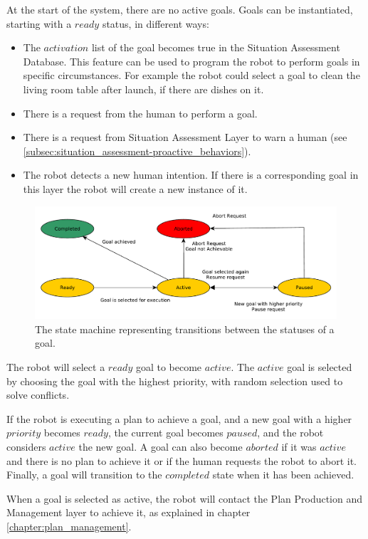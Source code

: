 At the start of the system, there are no active goals. Goals can be instantiated, starting with a $ready$ status, in different ways:
\begin{itemize}
\item The $activation$ list of the goal becomes true in the Situation Assessment Database. This feature can be used to program the robot to perform goals in specific circumstances. For example the robot could select a goal to clean the living room table after launch, if there are dishes on it.
\item There is a request from the human to perform a goal. 
\item There is a request from Situation Assessment Layer to warn a human (see \ref{subsec:situation_assessment-proactive_behaviors}).
\item The robot detects a new human intention. If there is a corresponding goal in this layer the robot will create a new instance of it. 
\end{itemize}


\begin{figure}[h!]
	\centering
	\includegraphics[clip,scale=0.6]{img/goal_management/goal_cycle.pdf}
	\caption{The state machine representing transitions between the statuses of a goal.}
	\label{fig:goal_management-goal_cycle}
\end{figure}



The robot will select a $ready$ goal to become $active$. The $active$ goal is selected by choosing the goal with the highest priority, with random selection used to solve conflicts.

If the robot is executing a plan to achieve a goal, and a new goal with a higher $priority$ becomes $ready$, the current goal becomes $paused$, and the robot considers $active$ the new goal. A goal can also become $aborted$ if it was $active$ and there is no plan to achieve it or if the human requests the robot to abort it. Finally, a goal will transition to the $completed$ state when it has been achieved.

When a goal is selected as active, the robot will contact the Plan Production and Management layer to achieve it, as explained in chapter \ref{chapter:plan_management}.



